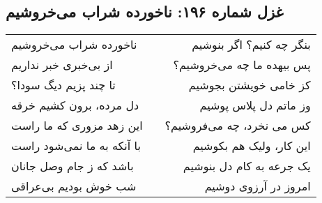 \begin{center}
\section*{غزل شماره ۱۹۶: ناخورده شراب می‌خروشیم}
\label{sec:196}
\begin{longtable}{l p{0.5cm} r}
ناخورده شراب می‌خروشیم
&&
بنگر چه کنیم؟ اگر بنوشیم
\\
از بی‌خبری خبر نداریم
&&
پس بیهده ما چه می‌خروشیم؟
\\
تا چند پزیم دیگ سودا؟
&&
کز خامی خویشتن بجوشیم
\\
دل مرده، برون کشیم خرقه
&&
وز ماتم دل پلاس پوشیم
\\
این زهد مزوری که ما راست
&&
کس می نخرد، چه می‌فروشیم؟
\\
با آنکه به ما نمی‌شود راست
&&
این کار، ولیک هم بکوشیم
\\
باشد که ز جام وصل جانان
&&
یک جرعه به کام دل بنوشیم
\\
شب خوش بودیم بی‌عراقی
&&
امروز در آرزوی دوشیم
\\
\end{longtable}
\end{center}
